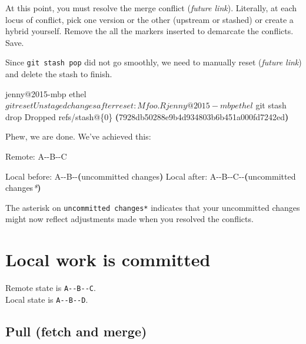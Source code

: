 \documentclass[
]{book}
\newenvironment{Shaded}{\begin{snugshade}}{\end{snugshade}}
\newcommand{\ErrorTok}[1]{\textcolor[rgb]{0.64,0.00,0.00}{\textbf{#1}}}
\newcommand{\ExtensionTok}[1]{#1}
\newcommand{\KeywordTok}[1]{\textcolor[rgb]{0.13,0.29,0.53}{\textbf{#1}}}
\newcommand{\NormalTok}[1]{#1}
\newcommand{\PreprocessorTok}[1]{\textcolor[rgb]{0.56,0.35,0.01}{\textit{#1}}}
\begin{document}
At this point, you must resolve the merge conflict (\emph{future link}). Literally, at each locus of conflict, pick one version or the other (upstream or stashed) or create a hybrid yourself. Remove the all the markers inserted to demarcate the conflicts. Save.

Since \texttt{git\ stash\ pop} did not go smoothly, we need to manually reset (\emph{future link}) and delete the stash to finish.

\begin{Shaded}
\begin{Highlighting}[]
\ExtensionTok{jenny@2015{-}mbp}\NormalTok{ ethel $ git reset}
\ExtensionTok{Unstaged}\NormalTok{ changes after reset:}
\ExtensionTok{M}\NormalTok{       foo.R}

\ExtensionTok{jenny@2015{-}mbp}\NormalTok{ ethel $ git stash drop}
\ExtensionTok{Dropped}\NormalTok{ refs/stash@\{0\} }\ErrorTok{(}\ExtensionTok{7928db50288e9b4d934803b6b451a000fd7242ed}\KeywordTok{)}
\end{Highlighting}
\end{Shaded}

Phew, we are done. We've achieved this:

\begin{Shaded}
\begin{Highlighting}[]
      \ExtensionTok{Remote:}\NormalTok{ A{-}{-}B{-}{-}C}

\ExtensionTok{Local}\NormalTok{ before: A{-}{-}B{-}{-}}\ErrorTok{(}\ExtensionTok{uncommitted}\NormalTok{ changes}\KeywordTok{)}
 \ExtensionTok{Local}\NormalTok{ after: A{-}{-}B{-}{-}C{-}{-}}\ErrorTok{(}\ExtensionTok{uncommitted}\NormalTok{ changes}\PreprocessorTok{*}\KeywordTok{)}
\end{Highlighting}
\end{Shaded}

The asterisk on \texttt{uncommitted\ changes*} indicates that your uncommitted changes might now reflect adjustments made when you resolved the conflicts.

\section{Local work is committed}\label{git-pull-with-local-commits}

Remote state is \texttt{A-\/-B-\/-C}.\\
Local state is \texttt{A-\/-B-\/-D}.

\subsection{Pull (fetch and merge)}\label{pull-fetch-and-merge}
\end{document}

